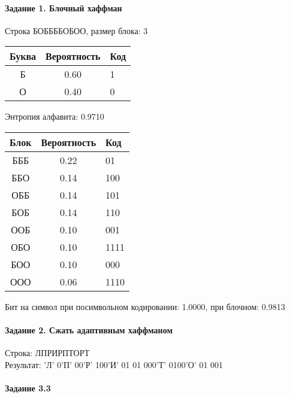 \documentclass[a4paper, 12pt]{article}
\begin{document}
\paragraph{Задание 1. Блочный хаффман \\}

Строка БОББББОБОО, размер блока: 3
\begin{center}
 \begin{tabular}{ |c|c|l| } 
  \hline
     Буква & Вероятность & Код\\ \hline
Б & 0.60 & 1\\\hline
О & 0.40 & 0
\\ \hline \end{tabular}
\end{center}
Энтропия алфавита: 0.9710
\begin{center}
 \begin{tabular}{ |c|c|l| } 
  \hline
     Блок & Вероятность & Код\\ \hline
БББ & 0.22 & 01\\\hline
ББО & 0.14 & 100\\\hline
ОББ & 0.14 & 101\\\hline
БОБ & 0.14 & 110\\\hline
ООБ & 0.10 & 001\\\hline
ОБО & 0.10 & 1111\\\hline
БОО & 0.10 & 000\\\hline
ООО & 0.06 & 1110
\\ \hline \end{tabular}
\end{center}
Бит на символ при посимвольном кодировании: 1.0000, при блочном: 0.9813


\pagebreak
\paragraph{Задание 2. Сжать адаптивным хаффманом\\}

Строка: 
ЛПРИРПТОРТ\\
Результат: 'Л' 0'П' 00'Р' 100'И' 01 01 000'Т' 0100'О' 01 001










\pagebreak

\paragraph{Задание 3.3}
\end{document}
